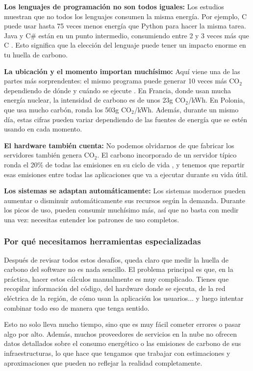 \documentclass[12pt,a4paper]{report}
\begin{document}
\textbf{Los lenguajes de programación no son todos iguales:} Los estudios muestran que no todos los lenguajes consumen la misma energía. Por ejemplo, C puede usar hasta 75 veces menos energía que Python para hacer la misma tarea. Java y C\# están en un punto intermedio, consumiendo entre 2 y 3 veces más que C \cite{ref7}. Esto significa que la elección del lenguaje puede tener un impacto enorme en tu huella de carbono.

\textbf{La ubicación y el momento importan muchísimo:} Aquí viene una de las partes más sorprendentes: el mismo programa puede generar 10 veces más CO$_2$ dependiendo de dónde y cuándo se ejecute \cite{ref8}. En Francia, donde usan mucha energía nuclear, la intensidad de carbono es de unos 23g CO$_2$/kWh. En Polonia, que usa mucho carbón, ronda los 503g CO$_2$/kWh. Además, durante un mismo día, estas cifras pueden variar dependiendo de las fuentes de energía que se estén usando en cada momento.

\textbf{El hardware también cuenta:} No podemos olvidarnos de que fabricar los servidores también genera CO$_2$. El carbono incorporado de un servidor típico ronda el 20\% de todas las emisiones en su ciclo de vida \cite{ref9}, y tenemos que repartir esas emisiones entre todas las aplicaciones que va a ejecutar durante su vida útil.

\textbf{Los sistemas se adaptan automáticamente:} Los sistemas modernos pueden aumentar o disminuir automáticamente sus recursos según la demanda. Durante los picos de uso, pueden consumir muchísimo más, así que no basta con medir una vez: necesitas entender los patrones de uso completos.

\subsubsection{Por qué necesitamos herramientas especializadas}

Después de revisar todos estos desafíos, queda claro que medir la huella de carbono del software no es nada sencillo. El problema principal es que, en la práctica, hacer estos cálculos manualmente es muy complicado. Tienes que recopilar información del código, del hardware donde se ejecuta, de la red eléctrica de la región, de cómo usan la aplicación los usuarios... y luego intentar combinar todo eso de manera que tenga sentido.

Esto no solo lleva mucho tiempo, sino que es muy fácil cometer errores o pasar algo por alto. Además, muchos proveedores de servicios en la nube no ofrecen datos detallados sobre el consumo energético o las emisiones de carbono de sus infraestructuras, lo que hace que tengamos que trabajar con estimaciones y aproximaciones que pueden no reflejar la realidad completamente.
\end{document}
